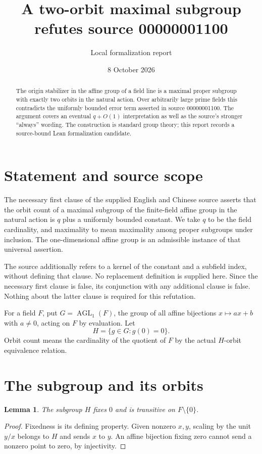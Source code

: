 \documentclass[11pt]{article}
\title{A two-orbit maximal subgroup refutes source 00000001100}
\author{Local formalization report}
\date{8 October 2026}
\newtheorem{lemma}[theorem]{Lemma}
\newcommand{\AGL}{\operatorname{AGL}}
\begin{document}
\maketitle

\begin{abstract}
The origin stabilizer in the affine group of a field line is a maximal proper
subgroup with exactly two orbits in the natural action. Over arbitrarily large
prime fields this contradicts the uniformly bounded error term asserted in
source 00000001100. The argument covers an eventual $q+O(1)$ interpretation as
well as the source's stronger ``always'' wording. The construction is standard
group theory; this report records a source-bound Lean formalization candidate.
\end{abstract}

\section{Statement and source scope}
The necessary first clause of the supplied English and Chinese source asserts
that the orbit count of a maximal subgroup of the finite-field affine group in
the natural action is $q$ plus a uniformly bounded constant. We take $q$ to be
the field cardinality, and maximality to mean maximality among proper subgroups
under inclusion. The one-dimensional affine group is an admissible instance of
that universal assertion.

The source additionally refers to a kernel of the constant and a subfield index,
without defining that clause. No replacement definition is supplied here. Since
the necessary first clause is false, its conjunction with any additional clause
is false. Nothing about the latter clause is required for this refutation.

For a field $F$, put $G=\AGL_1(F)$, the group of all affine bijections
$x\mapsto ax+b$ with $a\ne0$, acting on $F$ by evaluation. Let
\[
H=\{g\in G:g(0)=0\}.
\]
Orbit count means the cardinality of the quotient of $F$ by the actual
$H$-orbit equivalence relation.

\section{The subgroup and its orbits}
\begin{lemma}
The subgroup $H$ fixes $0$ and is transitive on $F\setminus\{0\}$.
\end{lemma}
\begin{proof}
Fixedness is its defining property. Given nonzero $x,y$, scaling by the unit
$y/x$ belongs to $H$ and sends $x$ to $y$. An affine bijection fixing zero cannot
send a nonzero point to zero, by injectivity.
\end{proof}
\end{document}
